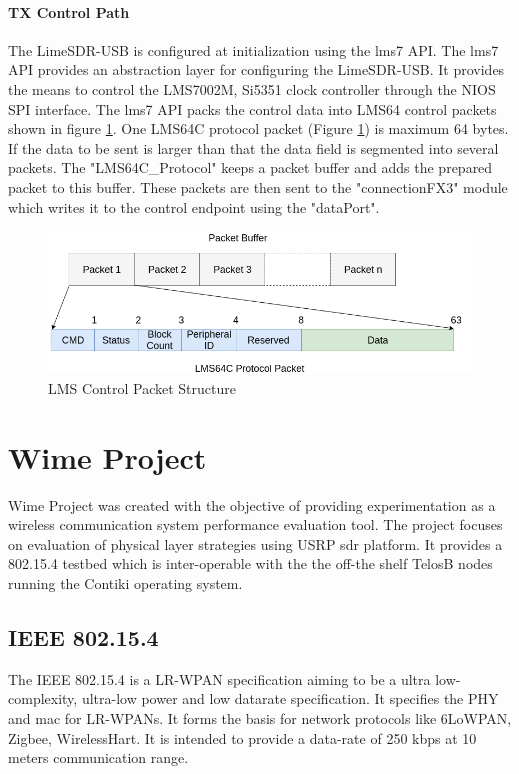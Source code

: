 \paragraph{TX Control Path} The LimeSDR-USB is configured at initialization using the lms7 \ac{API}.
The lms7 \ac{API} provides an abstraction layer for configuring the LimeSDR-USB.
It provides the means to control the LMS7002M, Si5351 clock controller through the NIOS SPI interface.
The lms7 API packs the control data into LMS64 control packets shown in figure \ref{lms_packet}.
One LMS64C protocol packet (Figure \ref{lms_packet}) is maximum 64 bytes.
If the data to be sent is larger than that the data field is segmented into several packets.
The "LMS64C\_Protocol" keeps a packet buffer and adds the prepared packet to this buffer.
These packets are then sent to the "connectionFX3" module which writes it to the control endpoint using the "dataPort".



\begin{figure}[h!]
\centering
\includegraphics[width=\textwidth]{Figure/LMS64C_Packet.png}
\caption{LMS Control Packet Structure}
\label{lms_packet}
\end{figure}

\section{Wime Project}
Wime Project was created with the objective of providing experimentation as a wireless communication system performance evaluation tool.
The project focuses on evaluation of physical layer strategies using USRP \ac{sdr} platform.
It provides a 802.15.4 testbed which is inter-operable with the the off-the shelf TelosB nodes running the Contiki operating system.

\subsection{IEEE 802.15.4}
The IEEE 802.15.4 is a \ac{LR-WPAN} specification aiming to be a ultra low-complexity, ultra-low power and low datarate specification.
It specifies the \ac{PHY} and \ac{mac} for \ac{LR-WPAN}s.
It forms the basis for network protocols like \ac{6LoWPAN}, Zigbee, WirelessHart.
It is intended to provide a data-rate of 250 kbps at 10 meters communication range.\\

